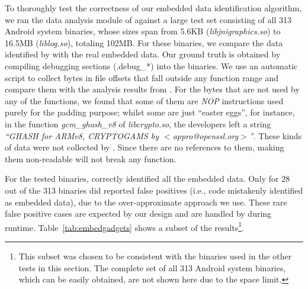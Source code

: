 To thoroughly test the correctness of our embedded data identification algorithm, we ran the data analysis module of \NDisassembler against a large test set consisting of all 313 Android system binaries, whose sizes span from 5.6KB (\textit{libjnigraphics.so}) to 16.5MB (\textit{liblog.so}), totaling 102MB. 
For these binaries, we compare the data identified by \textit{\NDisassembler} with the real embedded data. Our ground truth is obtained by compiling debugging sections (.debug\_*)\cite{dwarf} into the binaries. We use an automatic script to collect bytes in file offsets that fall outside any function range and compare them with the analysis results from \textit{\NDisassembler}. For the bytes that are not used by any of the functions, we found that some of them are {\it{NOP}} instructions used purely for the padding purpose; whilst some are just ``easter eggs'', for instance, in the function \textit{gcm\_ghash\_v8} of \textit{libcrypto.so}, the developers left a string \textit{``GHASH for ARMv8, CRYPTOGAMS by $<$appro@openssl.org$>$''}. These kinds of data were not collected by \NORAX. Since there are no references to them, making them non-readable will not break any function. 

For the tested binaries, \textit{\NDisassembler} correctly identified all the embedded data.  Only for 28 out of the 313 binaries did \NDisassembler reported false positives (i.e., code mistakenly identified as embedded data), due to the over-approximate approach we use. These rare false positive cases are expected by our design and are handled by \NMonitor during runtime. 
Table~\ref{tab:embedgadgets} shows a subset of the results\footnote{This subset was chosen to be consistent with the binaries used in the other tests in this section. The complete set of all 313 Android system binaries, which can be easily obtained, are not shown here due to the space limit.}.


